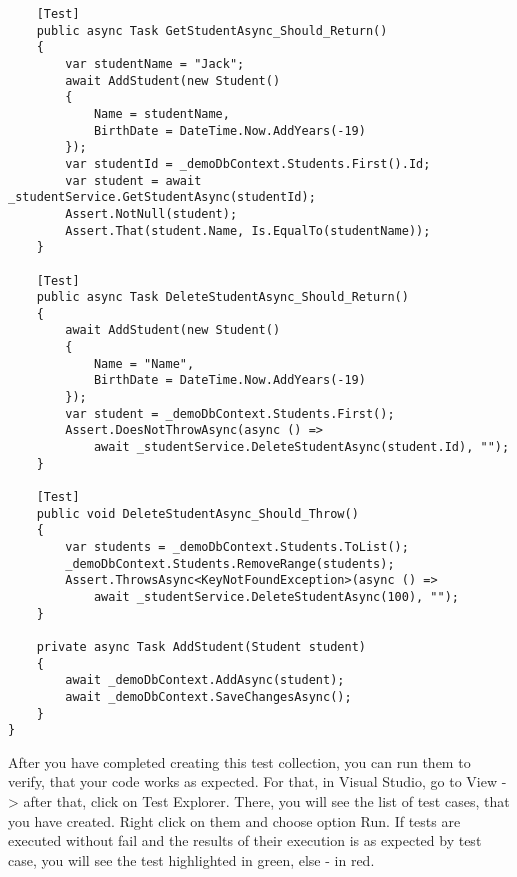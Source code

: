 \begin{lstlisting}
    [Test]
    public async Task GetStudentAsync_Should_Return()
    {
        var studentName = "Jack";
        await AddStudent(new Student()
        {
            Name = studentName,
            BirthDate = DateTime.Now.AddYears(-19)
        });
        var studentId = _demoDbContext.Students.First().Id;
        var student = await _studentService.GetStudentAsync(studentId);
        Assert.NotNull(student);
        Assert.That(student.Name, Is.EqualTo(studentName));
    }

    [Test]
    public async Task DeleteStudentAsync_Should_Return()
    {
        await AddStudent(new Student()
        {
            Name = "Name",
            BirthDate = DateTime.Now.AddYears(-19)
        });
        var student = _demoDbContext.Students.First();
        Assert.DoesNotThrowAsync(async () =>
            await _studentService.DeleteStudentAsync(student.Id), "");
    }

    [Test]
    public void DeleteStudentAsync_Should_Throw()
    {
        var students = _demoDbContext.Students.ToList();
        _demoDbContext.Students.RemoveRange(students);
        Assert.ThrowsAsync<KeyNotFoundException>(async () =>
            await _studentService.DeleteStudentAsync(100), "");
    }

    private async Task AddStudent(Student student)
    {
        await _demoDbContext.AddAsync(student);
        await _demoDbContext.SaveChangesAsync();
    }
}

\end{lstlisting}

After you have completed creating this test collection, you can run them to verify, that your code works as expected. For that, in Visual Studio, go to View -> after that, click on Test Explorer. There, you will see the list of test cases, that you have created. Right click on them and choose option Run. If tests are executed without fail and the results of their execution is as expected by test case, you will see the test highlighted in green, else - in red.

